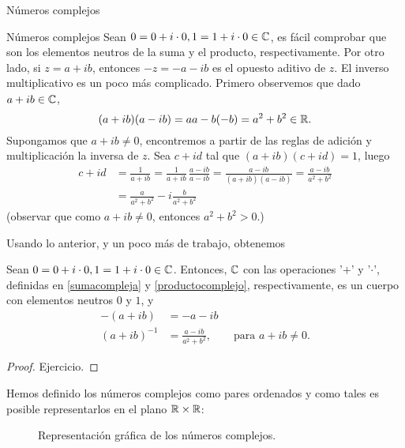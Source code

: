 \begin{chapter}{N\'umeros complejos}
\begin{section}{N\'umeros complejos}
    Sean $0 = 0 + i\cdot 0, 1 = 1 + i\cdot 0 \in \mathbb C$,  es fácil comprobar que son los elementos neutros de la suma y el producto,  respectivamente. Por otro lado, si $z = a + ib$,  entonces $-z = -a -ib$ es el opuesto aditivo de $z$.
    El inverso multiplicativo es un poco más complicado. Primero observemos que dado $a+ib \in \mathbb C$,
    \begin{equation*}
        (a+ ib)(a-ib) = aa -b(-b) = a^2 + b^2 \in \mathbb R.
    \end{equation*}
    Supongamos que $a+ib\ne0$,  encontremos  a partir  de las reglas de adición y multiplicación la inversa de $z$. Sea $c+id$ tal que $(a+ib)(c+id)=1$, luego
    \begin{align*}
        c + id & = \frac{1}{a+ib} = \frac{1}{a+ib}\,\frac{a-ib}{a-ib} = \frac{a-ib}{(a+ib)(a-ib)} =
        \frac{a-ib}{ a^2 + b^2}                                                                     \\
            & = \frac{a}{ a^2 + b^2} - i\frac{b}{ a^2 + b^2}
    \end{align*}
    (observar que como $a+ib\ne0$,  entonces $a^2 + b^2 >0$.)

    Usando lo anterior,  y un poco más de trabajo, obtenemos

    \begin{proposicion}
        Sean $0 = 0 + i\cdot 0, 1 = 1 + i\cdot 0\in \mathbb C$. Entonces, $\mathbb C$ con las operaciones '$+$' y '$\cdot$', definidas en \eqref{sumacompleja} y
        \eqref{productocomplejo},  respectivamente, es un cuerpo con elementos neutros $0$ y $1$, y
        \begin{align*}
            -(a+ib)     & = -a -ib                                                    \\
            (a+ib)^{-1} & = 	\frac{a-ib}{ a^2 + b^2}, \qquad \text{para $a+ib \ne 0$}.
        \end{align*}
    \end{proposicion}
    \begin{proof}
        Ejercicio.
    \end{proof}

    Hemos definido los números complejos como pares ordenados y como tales es posible representarlos en el plano $\mathbb R \times \mathbb R$:



    \begin{figure}[h]
        \centering
        \caption{Representación gráfica de los números complejos. }
    \end{figure}



\end{section}
\end{chapter}
